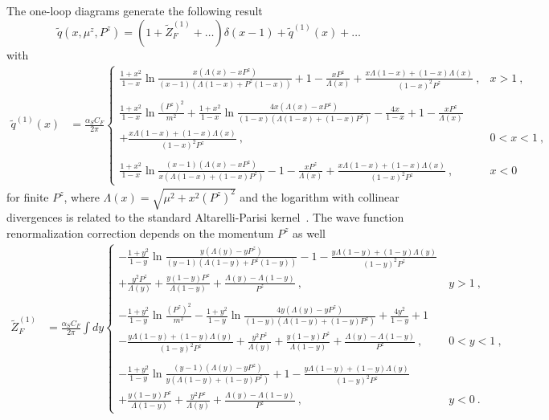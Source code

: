 The one-loop diagrams generate the following result
\begin{equation}
                    \tilde q(x, \mu^z, P^z) = (1+\tilde Z^{(1)}_F+\dots) \delta(x-1) + \tilde q^{(1)}(x) + \dots
\end{equation}
with
\begin{align}\label{unpolvertexnoexp}
\tilde q^{(1)}(x)&=\frac{\alpha_S C_F}{2\pi} \left\{ \begin{array} {ll} \frac{1+x^2}{1-x}\ln \frac{x(\Lambda(x)-x P^z)}{(x-1)(\Lambda(1-x)+P^z(1-x))}+1-\frac{x P^z}{\Lambda(x)}+\frac{x\Lambda(1-x)+(1-x)\Lambda(x)}{(1-x)^2 P^z}\ , & x>1\ , \\
\ \\
\frac{1+x^2}{1-x}\ln\frac{(P^z)^2}{m^2}+\frac{1+x^2}{1-x}\ln \frac{4x(\Lambda(x)-x P^z)}{(1-x)(\Lambda(1-x)+(1-x)P^z)}-\frac{4x}{1-x}+1-\frac{x P^z}{\Lambda(x)}\ & \\
+\frac{x\Lambda(1-x)+(1-x)\Lambda(x)}{(1-x)^2 P^z}\ , & 0<x<1\ , \\
\ \\
\frac{1+x^2}{1-x}\ln \frac{(x-1)(\Lambda(x)-x P^z)}{x(\Lambda(1-x)+(1-x)P^z)}-1-\frac{x P^z}{\Lambda(x)}+\frac{x\Lambda(1-x)+(1-x)\Lambda(x)}{(1-x)^2P^z}\ , & x<0 \end{array} \right.
\end{align}
for finite $P^z$, where $\Lambda(x)=\sqrt{\mu^2+x^2 (P^z)^2}$ and the logarithm with collinear divergences
is related to the standard Altarelli-Parisi kernel~\cite{AP}. The wave function renormalization correction
depends on the momentum $P^z$ as well
\begin{align}\label{selfnoexp}
\tilde Z^{(1)}_F&=\frac{\alpha_S C_F}{2\pi} \int dy \left\{ \begin{array} {ll} -\frac{1+y^2}{1-y}\ln \frac{y(\Lambda(y)-y P^z)}{(y-1)(\Lambda(1-y)+P^z(1-y))}-1-\frac{y\Lambda(1-y)+(1-y)\Lambda(y)}{(1-y)^2 P^z}\ & \\
+\frac{y^2 P^z}{\Lambda(y)}+\frac{y(1-y)P^z}{\Lambda(1-y)}+\frac{\Lambda(y)-\Lambda(1-y)}{P^z}\ , & y>1\ , \\
\ \\
-\frac{1+y^2}{1-y}\ln\frac{(P^z)^2}{m^2}-\frac{1+y^2}{1-y}\ln \frac{4y(\Lambda(y)-y P^z)}{(1-y)(\Lambda(1-y)+(1-y)P^z)}+\frac{4y^2}{1-y}+1\ & \\
-\frac{y\Lambda(1-y)+(1-y)\Lambda(y)}{(1-y)^2P^z}+\frac{y^2 P^z}{\Lambda(y)}+\frac{y(1-y)P^z}{\Lambda(1-y)}+\frac{\Lambda(y)-\Lambda(1-y)}{P^z}\ , & 0<y<1\ , \\
\ \\
-\frac{1+y^2}{1-y}\ln \frac{(y-1)(\Lambda(y)-y P^z)}{y(\Lambda(1-y)+(1-y)P^z)}+1-\frac{y\Lambda(1-y)+(1-y)\Lambda(y)}{(1-y)^2P^z}\ & \\
+\frac{y(1-y)P^z}{\Lambda(1-y)}+\frac{y^2 P^z}{\Lambda(y)}+\frac{\Lambda(y)-\Lambda(1-y)}{P^z}\ , & y<0\ . \end{array} \right.
\end{align}
